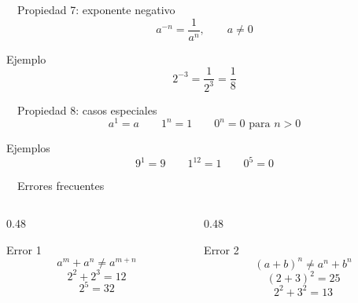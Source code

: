 \documentclass[aspectratio=169,10pt,handout]{beamer}
\newcommand{\pp}{\pause}
\newcommand{\iconoDesarrollo}{\faBrain}
\newcommand{\iconoError}{\faExclamationTriangle}
\begin{document}
	\begin{frame}{\iconoDesarrollo\ \ Propiedad 7: exponente negativo}
		\[
		a^{-n}=\frac{1}{a^n},\qquad a\neq0
		\]
		
		\pp
		
		\begin{exampleblock}{Ejemplo}
			\[
			2^{-3}=\frac{1}{2^3}=\frac{1}{8}
			\]
		\end{exampleblock}
	\end{frame}
	
	\begin{frame}{\iconoDesarrollo\ \ Propiedad 8: casos especiales}
		\[
		a^1=a
		\qquad
		1^n=1
		\qquad
		0^n=0 \text{ para } n>0
		\]
		
		\pp
		
		\begin{exampleblock}{Ejemplos}
			\[
			9^1=9
			\qquad
			1^{12}=1
			\qquad
			0^5=0
			\]
		\end{exampleblock}
	\end{frame}
	
	\begin{frame}{\iconoError\ \ Errores frecuentes}
		\begin{columns}[T,totalwidth=\textwidth]
			\begin{column}{0.48\textwidth}
				\begin{alertblock}{Error 1}
					\[
					a^m+a^n \neq a^{m+n}
					\]
					\[
					2^2+2^3=12
					\]
					\[
					2^5=32
					\]
				\end{alertblock}
			\end{column}
			\begin{column}{0.48\textwidth}
				\begin{alertblock}{Error 2}
					\[
					(a+b)^n \neq a^n+b^n
					\]
					\[
					(2+3)^2=25
					\]
					\[
					2^2+3^2=13
					\]
				\end{alertblock}
			\end{column}
		\end{columns}
	\end{frame}
	
\end{document}
